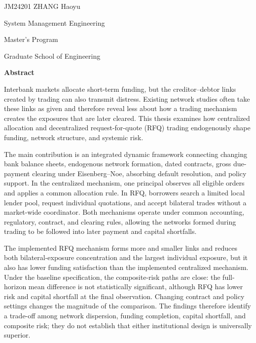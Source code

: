 \vspace{0.9cm}

\begin{flushright}
{\fontsize{10.5pt}{16pt}\selectfont
JM24201 ZHANG Haoyu\par
System Management Engineering\par
Master's Program\par
Graduate School of Engineering\par}
\end{flushright}

\vspace{0.3cm}

\begin{center}
{\fontsize{14pt}{18pt}\selectfont\bfseries Abstract\par}
\end{center}

\vspace{0.15cm}
\begingroup
\fontsize{10.5pt}{17pt}\selectfont

Interbank markets allocate short-term funding, but the creditor--debtor links created by trading can also transmit distress. Existing network studies often take these links as given and therefore reveal less about how a trading mechanism creates the exposures that are later cleared. This thesis examines how centralized allocation and decentralized request-for-quote (RFQ) trading endogenously shape funding, network structure, and systemic risk.

The main contribution is an integrated dynamic framework connecting changing bank balance sheets, endogenous network formation, dated contracts, gross due-payment clearing under Eisenberg--Noe, absorbing default resolution, and policy support. In the centralized mechanism, one principal observes all eligible orders and applies a common allocation rule. In RFQ, borrowers search a limited local lender pool, request individual quotations, and accept bilateral trades without a market-wide coordinator. Both mechanisms operate under common accounting, regulatory, contract, and clearing rules, allowing the networks formed during trading to be followed into later payment and capital shortfalls.

The implemented RFQ mechanism forms more and smaller links and reduces both bilateral-exposure concentration and the largest individual exposure, but it also has lower funding satisfaction than the implemented centralized mechanism. Under the baseline specification, the composite-risk paths are close: the full-horizon mean difference is not statistically significant, although RFQ has lower risk and capital shortfall at the final observation. Changing contract and policy settings changes the magnitude of the comparison. The findings therefore identify a trade-off among network dispersion, funding completion, capital shortfall, and composite risk; they do not establish that either institutional design is universally superior.

